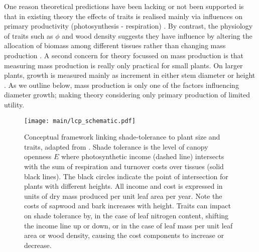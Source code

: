 \documentclass[9pt,twocolumn,twoside]{pnas-new}
\begin{document}
One reason theoretical predictions have been lacking or not been supported is that in existing theory the effects of traits is realised mainly via influences on primary productivity (photosynthesis - respiration) \citep{Wright-2000, Enquist-2007}. By contrast, the physiology of traits such as $\phi$ and wood density suggests they have influence by altering the allocation of biomass among different tissues rather than changing mass production \citep{Falster-2011, Duursma-2016, Gibert-2016}. A second concern for theory focussed on mass production is that measuring mass production is really only practical for small plants. On larger plants, growth is measured mainly as increment in either stem diameter or height \citep{Purves-2008, Anderson-2015, Kunstler-2016}. As we outline below, mass production is only one of the factors influencing diameter growth; making theory considering only primary production of limited utility.

\begin{figure}[!ht]
\centering
\texttt{[image: main/lcp\_schematic.pdf]}
\caption{Conceptual framework linking shade-tolerance to plant size and traits, adapted from \citep{Givnish-1988}. Shade tolerance is the level of canopy openness $E$ where photosynthetic income (dashed line) intersects with the sum of respiration and turnover costs over tissues (solid black lines). The black circles indicate the point of intersection for plants with different heights. All income and cost is expressed in units of dry mass produced  per unit leaf area per year. Note the costs of sapwood and bark increases with height.
Traits can impact on shade tolerance by, in the case of leaf nitrogen content, shifting the income line up or down, or in the case of leaf mass per unit leaf area or wood density, causing the cost components to increase or decrease.
\label{fig:wplcp_idea}}
\end{figure}
\end{document}

